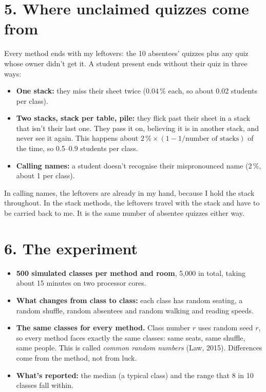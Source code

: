 \documentclass[10.5pt,a4paper]{article}
\begin{document}
\section*{5. Where unclaimed quizzes come from}
Every method ends with my leftovers: the 10 absentees' quizzes plus any quiz whose owner didn't get it. A student present ends without their quiz in three ways:
\begin{itemize}
\item \textbf{One stack:} they miss their sheet twice ($0.04\,\%$ each, so about 0.02 students per class).
\item \textbf{Two stacks, stack per table, pile:} they flick past their sheet in a stack that isn't their last one. They pass it on, believing it is in another stack, and never see it again. This happens about $2\,\%\times(1-1/\text{number of stacks})$ of the time, so 0.5--0.9 students per class.
\item \textbf{Calling names:} a student doesn't recognise their mispronounced name ($2\,\%$, about 1 per class).
\end{itemize}
In calling names, the leftovers are already in my hand, because I hold the stack throughout. In the stack methods, the leftovers travel with the stack and have to be carried back to me. It is the same number of absentee quizzes either way.

\section*{6. The experiment}
\begin{itemize}
\item \textbf{500 simulated classes per method and room}, 5{,}000 in total, taking about 15 minutes on two processor cores.
\item \textbf{What changes from class to class:} each class has random seating, a random shuffle, random absentees and random walking and reading speeds.
\item \textbf{The same classes for every method.} Class number $r$ uses random seed $r$, so every method faces exactly the same classes: same seats, same shuffle, same people. This is called \emph{common random numbers} (Law, 2015). Differences come from the method, not from luck.
\item \textbf{What's reported:} the median (a typical class) and the range that 8 in 10 classes fall within.
\end{itemize}
\end{document}
